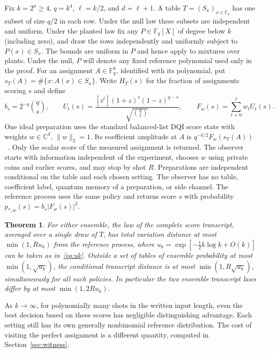 \documentclass[11pt]{article}
\newtheorem{theorem}{Theorem}
\newcommand{\F}{\mathbb F}
\begin{document}
Fix $k=2^a\ge4$, $q=k^4$, $\ell=k/2$, and $d=\ell+1$. A table $T=(S_x)_{x\in\F_q}$ has one subset of size $q/2$ in each row. Under the null law these subsets are independent and uniform. Under the planted law fix any $P\in\F_q[X]$ of degree below $k$ (including zero), and draw the rows independently and uniformly subject to $P(x)\in S_x$. The bounds are uniform in $P$ and hence apply to mixtures over plants. Under the null, $P$ will denote any fixed reference polynomial used only in the proof. For an assignment $A\in\F_q^k$, identified with its polynomial, put $s_T(A)=\#\{x:A(x)\in S_x\}$. Write $H_T(s)$ for the fraction of assignments scoring $s$ and define
\[
 b_s=2^{-q}\binom qs,\qquad
 U_t(s)=\frac{[z^t](1+z)^s(1-z)^{q-s}}{\sqrt{\binom qt}},
 \qquad F_w(s)=\sum_{t=0}^{\ell}w_t U_t(s).
\]
One ideal preparation uses the standard balanced-list DQI score state with weights $w\in\mathbb C^d$, $\|w\|_2=1$. Its coefficient amplitude at $A$ is $q^{-k/2}F_w(s_T(A))$~\cite{jordan}. Only the scalar score of the measured assignment is returned. The observer starts with information independent of the experiment, chooses $w$ using private coins and earlier scores, and may stop by shot $R$. Preparations are independent conditional on the table and each chosen setting. The observer has no table, coefficient label, quantum memory of a preparation, or side channel. The reference process uses the same policy and returns score $s$ with probability $p_{*,w}(s)=b_s|F_w(s)|^2$.

\begin{theorem}\label{thm:main}
For either ensemble, the law of the complete score transcript, averaged over a single draw of $T$, has total variation distance at most $\min(1,Ru_k)$ from the reference process, where $u_k=\exp[-\tfrac12 k\log k+O(k)]$ can be taken as in~\eqref{eq:uk}. Outside a set of tables of ensemble probability at most $\min(1,\sqrt{u_k})$, the conditional transcript distance is at most $\min(1,R\sqrt{u_k})$, simultaneously for all such policies. In particular the two ensemble transcript laws differ by at most $\min(1,2Ru_k)$.
\end{theorem}

As $k\to\infty$, for polynomially many shots in the written input length, even the best decision based on these scores has negligible distinguishing advantage. Each setting still has its own generally nonbinomial reference distribution. The cost of visiting the perfect assignment is a different quantity, computed in Section~\ref{sec:witness}.
\end{document}
